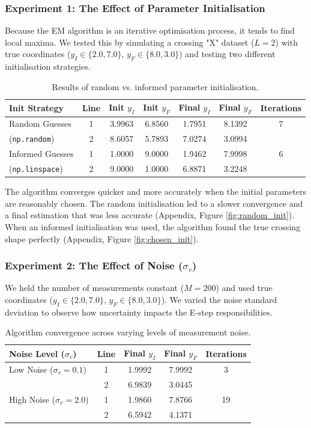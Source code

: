 \documentclass{article}
\begin{document}
\subsubsection{Experiment 1: The Effect of Parameter Initialisation}
Because the EM algorithm is an iterative optimisation process, it tends to find local maxima. We tested this by simulating a crossing "X" dataset ($L=2$) with true coordinates ($y_I \in \{2.0, 7.0\}$, $y_F \in \{8.0, 3.0\}$) and testing two different initialisation strategies.

\begin{table}[H]
\centering
\begin{tabular}{|l|c|c|c|c|c|c|}
\hline
\textbf{Init Strategy} & \textbf{Line} & \textbf{Init $y_I$} & \textbf{Init $y_F$} & \textbf{Final $y_I$} & \textbf{Final $y_F$} & \textbf{Iterations} \\ \hline
Random Guesses & 1 & 3.9963 & 6.8560 & 1.7951 & 8.1392 & 7 \\ 
(\texttt{np.random}) & 2 & 8.6057 & 5.7893 & 7.0274 & 3.0994 & \\ \hline
Informed Guesses & 1 & 1.0000 & 9.0000 & 1.9462 & 7.9998 & 6 \\ 
(\texttt{np.linspace}) & 2 & 9.0000 & 1.0000 & 6.8871 & 3.2248 & \\ \hline
\end{tabular}
\caption{Results of random vs. informed parameter initialisation.}
\label{tab:init}
\end{table}

The algorithm converges quicker and more accurately when the initial parameters are reasonably chosen. The random initialisation led to a slower convergence and a final estimation that was less accurate (Appendix, Figure \ref{fig:random_init}). When an informed initialisation was used, the algorithm found the true crossing shape perfectly (Appendix, Figure \ref{fig:chosen_init}).

\subsubsection{Experiment 2: The Effect of Noise ($\sigma_v$)}
We held the number of measurements constant ($M=200$) and used true coordinates ($y_I \in \{2.0, 7.0\}$, $y_F \in \{8.0, 3.0\}$). We varied the noise standard deviation to observe how uncertainty impacts the E-step responsibilities.

\begin{table}[H]
\centering
\begin{tabular}{|l|c|c|c|c|}
\hline
\textbf{Noise Level ($\sigma_v$)} & \textbf{Line} & \textbf{Final $y_I$} & \textbf{Final $y_F$} & \textbf{Iterations} \\ \hline
Low Noise ($\sigma_v = 0.1$) & 1 & 1.9992 & 7.9992 & 3 \\ 
 & 2 & 6.9839 & 3.0445 & \\ \hline
High Noise ($\sigma_v = 2.0$) & 1 & 1.9860 & 7.8766 & 19 \\ 
 & 2 & 6.5942 & 4.1371 & \\ \hline
\end{tabular}
\caption{Algorithm convergence across varying levels of measurement noise.}
\label{tab:noise}
\end{table}
\end{document}
